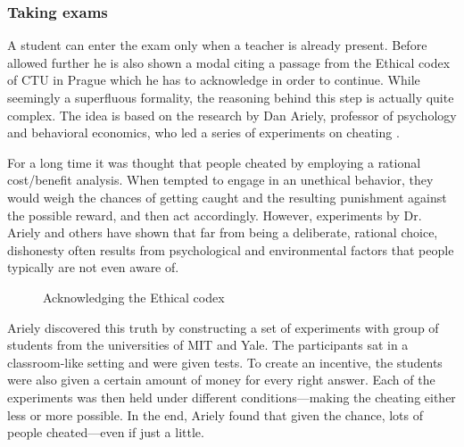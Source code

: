 \documentclass[thesis=M,english,hidelinks]{FITthesis}[2012/10/20]
\begin{document}
      \subsubsection{Taking exams}

A student can enter the exam only when a teacher is already present. Before allowed further he is also shown a modal citing a passage from the Ethical codex of CTU in Prague which he has to acknowledge in order to continue. While seemingly a superfluous formality, the reasoning behind this step is actually quite complex. The idea is based on the research by Dan Ariely, professor of psychology and behavioral economics, who led a series of experiments on cheating \cite{ariely}.

For a long time it was thought that people cheated by employing a rational cost/benefit analysis. When tempted to engage in an unethical behavior, they would weigh the chances of getting caught and the resulting punishment against the possible reward, and then act accordingly. However, experiments by Dr. Ariely and others have shown that far from being a deliberate, rational choice, dishonesty often results from psychological and environmental factors that people typically are not even aware of.

\begin{figure}
  \setlength\fboxsep{0pt}
  \setlength\fboxrule{0.2pt}
  \caption{Acknowledging the Ethical codex}
  \label{fig:ethical-codex}
\end{figure}

Ariely discovered this truth by constructing a set of experiments with group of students from the universities of MIT and Yale. The participants sat in a classroom-like setting and were given tests. To create an incentive, the students were also given a certain amount of money for every right answer. Each of the experiments was then held under different conditions---making the cheating either less or more possible. In the end, Ariely found that given the chance, lots of people cheated---even if just a little.
\end{document}
